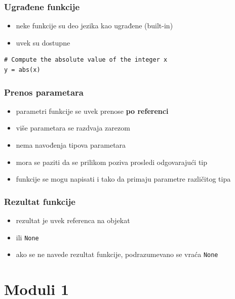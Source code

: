 \documentclass[compress]{beamer}
\begin{document}
\begin{frame}[fragile]
\frametitle{Ugrađene funkcije}
\begin{itemize}
  \item neke funkcije su deo jezika kao ugrađene (built-in)
  \item uvek su dostupne
\end{itemize}
\begin{verbatim}
# Compute the absolute value of the integer x
y = abs(x)
\end{verbatim}
\end{frame}
  
\begin{frame}[fragile]
\frametitle{Prenos parametara}
\begin{itemize}
  \item parametri funkcije se uvek prenose \textbf{po referenci}
  \item više parametara se razdvaja zarezom
  \item nema navođenja tipova parametara
\end{itemize}
\begin{itemize}
  \item mora se paziti da se prilikom poziva prosledi odgovarajući tip
  \item funkcije se mogu napisati i tako da primaju parametre različitog tipa
\end{itemize}
\end{frame}
  
\begin{frame}[fragile]
\frametitle{Rezultat funkcije}
\begin{itemize}
  \item rezultat je uvek referenca na objekat
  \item ili \texttt{None}
  \item ako se ne navede rezultat funkcije, podrazumevano se vraća \texttt{None}
\end{itemize}
\end{frame}

\section{Moduli 1}
\end{document}
